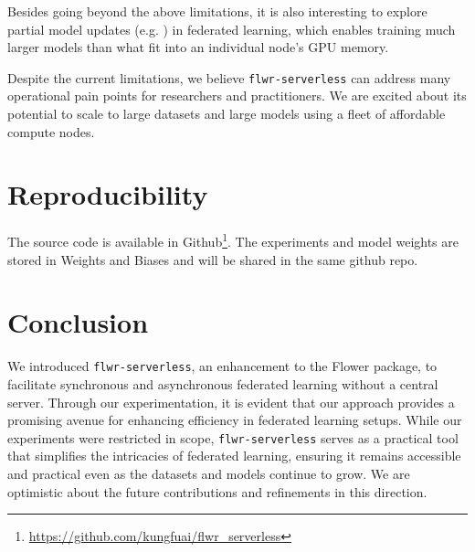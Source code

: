 \documentclass[twocolumn, switch]{article} %
\begin{document}
Besides going beyond the above limitations, it is also interesting to explore partial model updates (e.g. \cite{partial-model}) in federated learning, which enables training much larger models than what fit into an individual node's GPU memory.

Despite the current limitations, we believe \texttt{flwr-serverless} can address many operational pain points for researchers and practitioners. We are excited about its potential to scale to large datasets and large models using a fleet of affordable compute nodes.

\section{Reproducibility}

The source code is available in Github\footnote{\url{https://github.com/kungfuai/flwr_serverless}}. The experiments and model weights are stored in Weights and Biases and will be shared in the same github repo.

\section{Conclusion}

We introduced \texttt{flwr-serverless}, an enhancement to the Flower package, to facilitate synchronous and asynchronous federated learning without a central server. Through our experimentation, it is evident that our approach provides a promising avenue for enhancing efficiency in federated learning setups. While our experiments were restricted in scope, \texttt{flwr-serverless} serves as a practical tool that simplifies the intricacies of federated learning, ensuring it remains accessible and practical even as the datasets and models continue to grow. We are optimistic about the future contributions and refinements in this direction.





\normalsize



\end{document}
